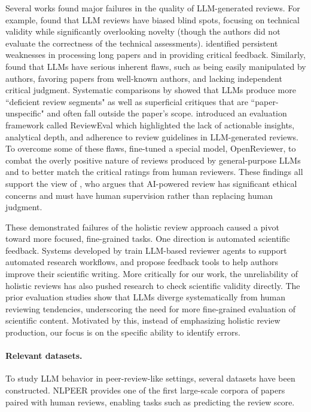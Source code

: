 \documentclass{article}
\begin{document}
Several works found major failures in the quality of LLM-generated reviews. For example, \citet{shin2025} found that LLM reviews have biased blind spots, focusing on technical validity while significantly overlooking novelty (though the authors did not evaluate the correctness of the technical assessments). \citet{zhou2024} identified persistent weaknesses in processing long papers and in providing critical feedback. Similarly, \citet{ye2024we} found that LLMs have serious inherent flaws, such as being easily manipulated by authors, favoring papers from well-known authors, and lacking independent critical judgment. Systematic comparisons by \citet{du2024} showed that LLMs produce more ``deficient review segments" as well as superficial critiques that are ``paper-unspecific" and often fall outside the paper's scope. \citet{garg2025} introduced an evaluation framework called ReviewEval which highlighted the lack of actionable insights, analytical depth, and adherence to review guidelines in LLM-generated reviews. To overcome some of these flaws, \citet{idahl2025} fine-tuned a special model, OpenReviewer, to combat the overly positive nature of reviews produced by general-purpose LLMs and to better match the critical ratings from human reviewers. These findings all support the view of \citet{seghier2024ai}, who argues that AI-powered review has significant ethical concerns and must have human supervision rather than replacing human judgment.

These demonstrated failures of the holistic review approach caused a pivot toward more focused, fine-grained tasks. One direction is automated scientific feedback. Systems developed by \citet{weng2025} train LLM-based reviewer agents to support automated research workflows, and \citet{chamoun2024} propose feedback tools to help authors improve their scientific writing. More critically for our work, the unreliability of holistic reviews has also pushed research to check scientific validity directly. The prior evaluation studies show that LLMs diverge systematically from human reviewing tendencies, underscoring the need for more fine-grained evaluation of scientific content. Motivated by this, instead of emphasizing holistic review production, our focus is on the specific ability to identify errors.


\paragraph{Relevant datasets.} To study LLM behavior in peer-review-like settings, several datasets have been constructed. NLPEER \citep{dycke2023} provides one of the first large-scale corpora of papers paired with human reviews, enabling tasks such as predicting the review score.
\end{document}
